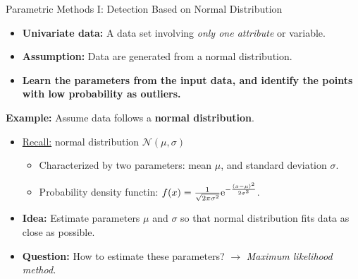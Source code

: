 \begin{frame}{Parametric Methods I: Detection Based on Normal Distribution}
	\begin{itemize}
		\item \textbf{Univariate data:} A data set involving \textit{only one attribute} or variable.
		\item \textbf{Assumption:} Data are generated from a normal distribution.
		\item \textbf{Learn the parameters from the input data, and identify the points with low probability as outliers.}
	\end{itemize}
	\vspace*{0.5em}
	\textbf{Example:} Assume data follows a \textbf{normal distribution}.
	\begin{itemize}
		\item \underline{Recall:} normal distribution $\mathcal{N}(\mu, \sigma)$
		      \begin{itemize}
			      \item Characterized by two parameters: mean $\mu$, and standard deviation $\sigma$.
			      \item Probability density functin: $f(x)=\frac{1}{\sqrt{2\pi \sigma^2}} {\rm e}^{-\frac{(x-\mu)^2}{2\sigma^2}}$.
		      \end{itemize}
		\item \textbf{\color{faugray}Idea:} Estimate parameters $\mu$ and $\sigma$ so that normal distribution fits data as close as possible.
		\item \textbf{Question:} How to estimate these parameters? $\rightarrow$ \textit{\color{faugray}Maximum likelihood method.}
	\end{itemize}
\end{frame}



